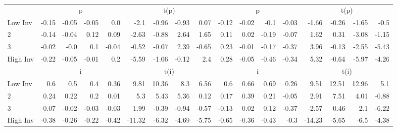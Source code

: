\begin{table}[!ht]
\begin{tabular}{lrrrrrrrrrrrrrrrr}
  
    
      & \multicolumn{4}{c}{p} & \multicolumn{4}{c}{t(p)}
    
      & \multicolumn{4}{c}{p} & \multicolumn{4}{c}{t(p)}
    
    \\
      \cmidrule(r){2-5} \cmidrule(r){6-9} \cmidrule(r){10-13} \cmidrule(r){14-17}

    Low Inv   & -0.15  & -0.05  & -0.05  & 0.0  & -2.1  & -0.96  & -0.93  & 0.07  & -0.12  & -0.02  & -0.1  & -0.03  & -1.66  & -0.26  & -1.65  & -0.5  \\
           2  & -0.14  & -0.04  & 0.12  & 0.09  & -2.63  & -0.88  & 2.64  & 1.65  & 0.11  & 0.02  & -0.19  & -0.07  & 1.62  & 0.31  & -3.08  & -1.15  \\
           3  & -0.02  & -0.0  & 0.1  & -0.04  & -0.52  & -0.07  & 2.39  & -0.65  & 0.23  & -0.01  & -0.17  & -0.37  & 3.96  & -0.13  & -2.55  & -5.43  \\
    High Inv  & -0.22  & -0.05  & -0.01  & 0.2  & -5.59  & -1.06  & -0.12  & 2.4  & 0.28  & -0.05  & -0.46  & -0.34  & 5.32  & -0.64  & -5.97  & -4.26  \\

  
    
      & \multicolumn{4}{c}{i} & \multicolumn{4}{c}{t(i)}
    
      & \multicolumn{4}{c}{i} & \multicolumn{4}{c}{t(i)}
    
    \\
      \cmidrule(r){2-5} \cmidrule(r){6-9} \cmidrule(r){10-13} \cmidrule(r){14-17}

    Low Inv   & 0.6  & 0.5  & 0.4  & 0.36  & 9.81  & 10.36  & 8.3  & 6.56  & 0.6  & 0.66  & 0.69  & 0.26  & 9.51  & 12.51  & 12.96  & 5.1  \\
           2  & 0.24  & 0.22  & 0.2  & 0.01  & 5.3  & 5.43  & 5.36  & 0.12  & 0.17  & 0.39  & 0.21  & -0.05  & 2.91  & 7.51  & 4.01  & -0.88  \\
           3  & 0.07  & -0.02  & -0.03  & -0.03  & 1.99  & -0.39  & -0.94  & -0.57  & -0.13  & 0.02  & 0.12  & -0.37  & -2.57  & 0.46  & 2.1  & -6.22  \\
    High Inv  & -0.38  & -0.26  & -0.22  & -0.42  & -11.32  & -6.32  & -4.69  & -5.75  & -0.65  & -0.36  & -0.43  & -0.3  & -14.23  & -5.65  & -6.5  & -4.38  \\

  

  \bottomrule
\end{tabular}
\label{tbl:32_Size_OP_Inv_FF2016b}
\end{table}